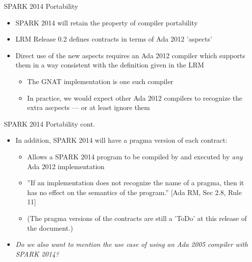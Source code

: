 \documentclass{beamer}
\begin{document}
\begin{frame}{SPARK 2014 Portability}

  \begin{itemize}
  \item SPARK 2014 will retain the property of compiler portability

  \item LRM Release 0.2 defines contracts in terms of Ada 2012 'aspects'

  \item Direct use of the new aspects requires an Ada 2012 compiler which supports them in a way consistent with the definition given in the LRM

    \begin{itemize}
    \item The GNAT implementation is one such compiler
    \item In practice, we would expect other Ada 2012 compilers to recognize the extra ascpects --- or at least ignore them
    \end{itemize}

\end{itemize}

\end{frame}

\begin{frame}{SPARK 2014 Portability cont.}

  \begin{itemize}
  \item In addition, SPARK 2014 will have a pragma version of each contract:

    \begin{itemize}
    \item Allows a SPARK 2014 program to be compiled by and executed by \emph{any} Ada 2012 implementation

    \item ''If an implementation does not recognize the name of a pragma, then it has no effect on the semantics of the program.'' [Ada RM, Sec 2.8, Rule 11]

    \item (The pragma versions of the contracts are still a 'ToDo' at this release of the document.)

    \end{itemize}

  \item \emph{Do we also want to mention the use case of using an Ada 2005 compiler with SPARK 2014?}

\end{itemize}

\end{frame}
\end{document}
